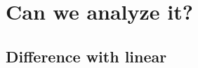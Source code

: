 \documentclass{beamer}
\begin{document}
\begin{frame}
\begin{center}
\begin{minipage}[l]{0.42\framewidth}
\end{minipage}
\begin{minipage}[r]{0.42\framewidth}
\vspace{0.1cm}
\end{minipage}
\end{center}
\end{frame}






\section{Can we analyze it?}

\subsection{Difference with linear}
\end{document}
